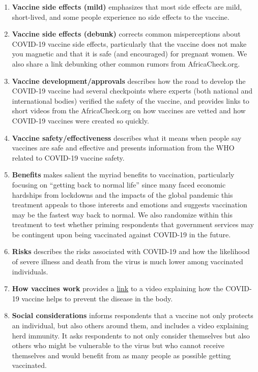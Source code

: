 \documentclass[letterpaper, 12pt, parskip=full,DIV=10]{scrartcl}
\begin{document}
\begin{enumerate}
  \item \textbf{Vaccine side effects (mild)} emphasizes that most side effects are mild, short-lived, and some people experience no side effects to the vaccine. 
  \item \textbf{Vaccine side effects (debunk)} corrects common misperceptions about COVID-19 vaccine side effects, particularly that the vaccine does not make you magnetic and that it is safe (and encouraged) for pregnant women. We also share a link debunking other common rumors from AfricaCheck.org.
  \item \textbf{Vaccine development/approvals} describes how the road to develop the COVID-19 vaccine had several checkpoints where experts (both national and international bodies) verified the safety of the vaccine, and provides links to short videos from the AfricaCheck.org on how vaccines are vetted and how COVID-19 vaccines were created so quickly. 
  \item \textbf{Vaccine safety/effectiveness} describes what it means when people say vaccines are safe and effective and presents information from the WHO related to COVID-19 vaccine safety.
  \item \textbf{Benefits} makes salient the myriad benefits to vaccination, particularly focusing on ``getting back to normal life'' since many faced economic hardships from lockdowns and the impacts of the global pandemic this treatment appeals to those interests and emotions and suggests vaccination may be the fastest way back to normal. We also randomize within this treatment to test whether priming respondents that government services may be contingent upon being vaccinated against COVID-19 in the future.
  \item \textbf{Risks} describes the risks associated with COVID-19 and how the likelihood of severe illness and death from the virus is much lower among vaccinated individuals.
  \item \textbf{How vaccines work} provides a \href{https://www.facebook.com/dataforsociety/videos/4265014093602814}{link} to a video explaining how the COVID-19 vaccine helps to prevent the disease in the body. 
  \item \textbf{Social considerations} informs respondents that a vaccine not only protects an individual, but also others around them, and includes a video explaining herd immunity. It asks respondents to not only consider themselves but also others who might be vulnerable to the virus but who cannot receive themselves and would benefit from as many people as possible getting vaccinated.

\end{enumerate}
\end{document}
